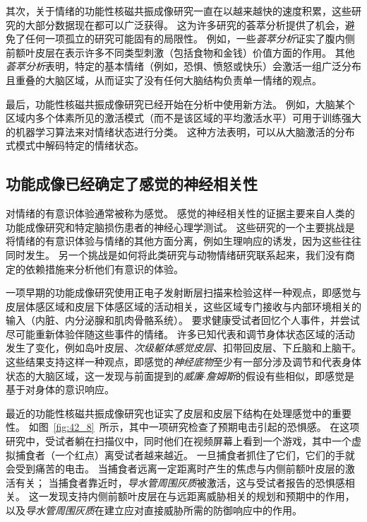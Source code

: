 其次，关于情绪的功能性核磁共振成像研究一直在以越来越快的速度积累，这些研究的大部分数据现在都可以广泛获得。
这为许多研究的荟萃分析提供了机会，避免了任何一项孤立的研究可能固有的局限性。
例如，一些\textit{荟萃分析}证实了腹内侧前额叶皮层在表示许多不同类型刺激（包括食物和金钱）价值方面的作用。
其他\textit{荟萃分析}表明，特定的基本情绪（例如，恐惧、愤怒或快乐）会激活一组广泛分布且重叠的大脑区域，从而证实了没有任何大脑结构负责单一情绪的观点。


最后，功能性核磁共振成像研究已经开始在分析中使用新方法。
例如，大脑某个区域内多个体素所见的激活​​模式（而不是该区域的平均激活水平）可用于训练强大的机器学习算法来对情绪状态进行分类。
这种方法表明，可以从大脑激活的分布式模式中解码特定的情绪状态。



\subsection{功能成像已经确定了感觉的神经相关性}

对情绪的有意识体验通常被称为感觉。
感觉的神经相关性的证据主要来自人类的功能成像研究和特定脑损伤患者的神经心理学测试。
这些研究的一个主要挑战是将情绪的有意识体验与情绪的其他方面分离，例如生理响应的诱发，因为这些往往同时发生。
另一个挑战是如何将此类研究与动物情绪研究联系起来，我们没有商定的依赖措施来分析他们有意识的体验。


一项早期的功能成像研究使用正电子发射断层扫描来检验这样一种观点，即感觉与皮层体感区域和皮层下体感区域的活动相关，这些区域专门接收与内部环境相关的输入（内脏、内分泌腺和肌肉骨骼系统）。
要求健康受试者回忆个人事件，并尝试尽可能重新体验伴随这些事件的情绪。
许多已知代表和调节身体状态区域的活动发生了变化，例如岛叶皮层、\textit{次级躯体感觉皮层}、扣带回皮层、下丘脑和上脑干。
这些结果支持这样一种观点，即感觉的\textit{神经底物}至少有一部分涉及调节和代表身体状态的大脑区域，这一发现与前面提到的\textit{威廉$\cdot$詹姆斯}的假设有些相似，即感觉是基于对身体的意识响应。


最近的功能性核磁共振成像研究也证实了皮层和皮层下结构在处理感觉中的重要性。
如图~\ref{fig:42_8}~所示，其中一项研究检查了预期电击引起的恐惧感。
在这项研究中，受试者躺在扫描仪中，同时他们在视频屏幕上看到一个游戏，其中一个虚拟捕食者（一个红点）离受试者越来越近。
一旦捕食者抓住了它们，它们的手就会受到痛苦的电击。
当捕食者远离一定距离时产生的焦虑与内侧前额叶皮层的激活有关；
当捕食者靠近时，\textit{导水管周围灰质}被激活，这与受试者报告的恐惧感相关。
这一发现支持内侧前额叶皮层在与远距离威胁相关的规划和预期中的作用，以及\textit{导水管周围灰质}在建立应对直接威胁所需的防御响应中的作用。


